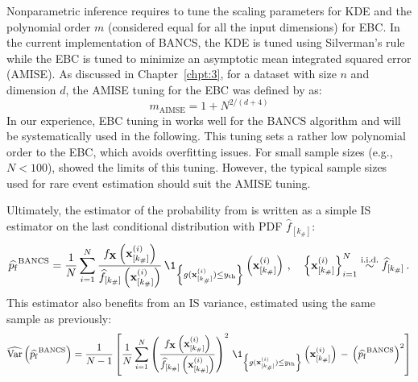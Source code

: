 Nonparametric inference requires to tune the scaling parameters for KDE and the polynomial order $m$ (considered equal for all the input dimensions) for EBC. 
In the current implementation of BANCS, the KDE is tuned using Silverman's rule\footnotemark~\citep{silverman_1981} while the EBC is tuned to minimize an asymptotic mean integrated squared error (AMISE). 
As discussed in Chapter~\ref{chpt:3}, for a dataset with size $n$ and dimension $d$, the AMISE tuning for the EBC was defined by \citet{sancetta_satchell_2004} as:
\begin{equation}\label{eq:amise_tuning}
    m_{\mathrm{AIMSE}} = 1 + N^{2/(d+4)}
\end{equation}
In our experience, EBC tuning in  works well for the BANCS algorithm and will be systematically used in the following. 
This tuning sets a rather low polynomial order to the EBC, which avoids overfitting issues. 
For small sample sizes (e.g., $N<100$), \citet{segers_2017} showed the limits of this tuning. 
However, the typical sample sizes used for rare event estimation should suit the AMISE tuning. 


Ultimately, the estimator of the probability from  is written as a simple IS estimator on the last conditional distribution with PDF $\widehat{f}_{[k_\#]}$:
\begin{equation}
    \widehat{\pf}^{\mathrm{BANCS}} = \frac1N \sum_{i=1}^N \frac{f_\bX\left(\bx_{[k_\#]}^{(i)}\right)}{\widehat{f}_{[k_\#]}\left(\bx_{[k_\#]}^{(i)}\right)} \, \1_{\left\{g(\bx_{[k_\#]}^{(i)}) \leq \yth \right\}}\left(\bx_{[k_\#]}^{(i)}\right)\, , \quad \left\{\bx_{[k_\#]}^{(i)}\right\}_{i=1}^N  \overset{\text{i.i.d.}}{\sim} \widehat{f}_{[k_\#]} \, .
\end{equation}
This estimator also benefits from an IS variance, estimated using the same sample as previously:
\begin{equation}
    \what{\var}\left(\widehat{\pf}^{\mathrm{BANCS}}\right) = \frac{1}{N-1} \left[\frac1N \sum_{i=1}^N \left(\frac{f_\bX\left(\bx_{[k_\#]}^{(i)}\right)}{\widehat{f}_{[k_\#]}\left(\bx_{[k_\#]}^{(i)}\right)}\right)^2 \, \1_{\left\{g(\bx_{[k_\#]}^{(i)}) \leq \yth \right\}}\left(\bx_{[k_\#]}^{(i)}\right) \, - \, \left(\widehat{\pf}^{\mathrm{BANCS}}\right)^2\right]
\end{equation}

